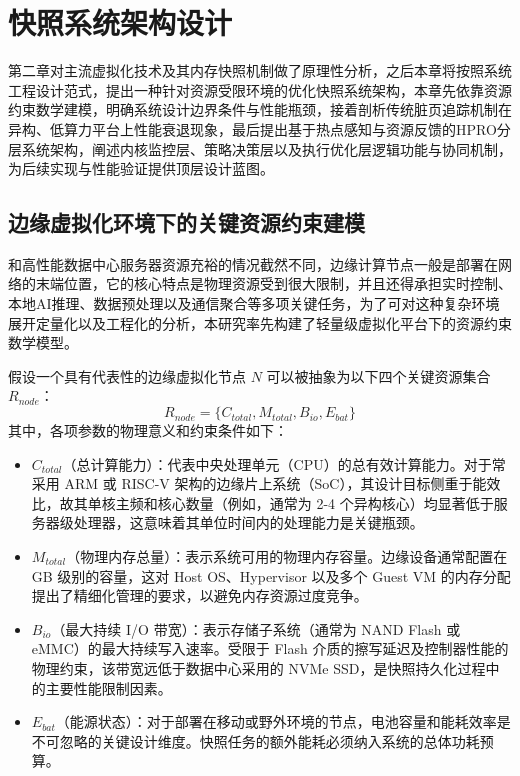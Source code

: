 
\chapter{快照系统架构设计}
\label{ch:design}

第二章对主流虚拟化技术及其内存快照机制做了原理性分析，之后本章将按照系统工程设计范式，提出一种针对资源受限环境的优化快照系统架构，本章先依靠资源约束数学建模，明确系统设计边界条件与性能瓶颈，接着剖析传统脏页追踪机制在异构、低算力平台上性能衰退现象，最后提出基于热点感知与资源反馈的HPRO分层系统架构，阐述内核监控层、策略决策层以及执行优化层逻辑功能与协同机制，为后续实现与性能验证提供顶层设计蓝图。

\section{边缘虚拟化环境下的关键资源约束建模}
\label{sec:constraint}

和高性能数据中心服务器资源充裕的情况截然不同，边缘计算节点一般是部署在网络的末端位置，它的核心特点是物理资源受到很大限制，并且还得承担实时控制、本地AI推理、数据预处理以及通信聚合等多项关键任务，为了可对这种复杂环境展开定量化以及工程化的分析，本研究率先构建了轻量级虚拟化平台下的资源约束数学模型。

假设一个具有代表性的边缘虚拟化节点 $N$ 可以被抽象为以下四个关键资源集合 $R_{node}$：
$$R_{node} = \{ C_{total}, M_{total}, B_{io}, E_{bat} \}$$
其中，各项参数的物理意义和约束条件如下：

\begin{itemize}
	\item $C_{total}$（总计算能力）：代表中央处理单元（CPU）的总有效计算能力。对于常采用 ARM 或 RISC-V 架构的边缘片上系统（SoC），其设计目标侧重于能效比，故其单核主频和核心数量（例如，通常为 2-4 个异构核心）均显著低于服务器级处理器，这意味着其单位时间内的处理能力是关键瓶颈。

	\item $M_{total}$（物理内存总量）：表示系统可用的物理内存容量。边缘设备通常配置在 GB 级别的容量，这对 Host OS、Hypervisor 以及多个 Guest VM 的内存分配提出了精细化管理的要求，以避免内存资源过度竞争。

	\item $B_{io}$（最大持续 I/O 带宽）：表示存储子系统（通常为 NAND Flash 或 eMMC）的最大持续写入速率。受限于 Flash 介质的擦写延迟及控制器性能的物理约束，该带宽远低于数据中心采用的 NVMe SSD，是快照持久化过程中的主要性能限制因素。

	\item $E_{bat}$（能源状态）：对于部署在移动或野外环境的节点，电池容量和能耗效率是不可忽略的关键设计维度。快照任务的额外能耗必须纳入系统的总体功耗预算。
\end{itemize}

